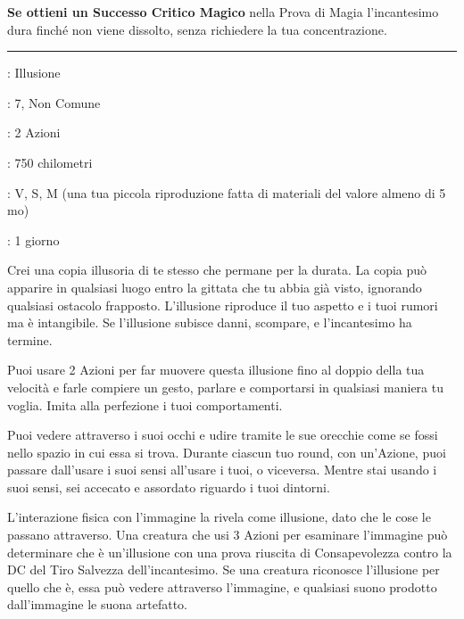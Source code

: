 \begin{multicols}{2}
\textbf{Se ottieni un Successo Critico Magico} nella Prova di Magia l'incantesimo dura finché non viene dissolto, senza richiedere la tua concentrazione.

\smallskip\noindent\rule{\linewidth}{2pt} \hypertarget{Immagine Proiettata}{}\medskip{}
\noindent
\begin{description}[noitemsep, topsep=0pt, parsep=0pt, partopsep=0pt, leftmargin=0cm, labelwidth=2.8cm]
	\item[\textbf{Lista di Magia}]: Illusione
	\item[\textbf{Livello}]: 7, Non Comune
	\item[\textbf{T. di Lancio}]: 2 Azioni
	\item[\textbf{Gittata}]: 750 chilometri
	\item[\textbf{Componenti}]: V, S, M (una tua piccola riproduzione fatta di materiali del valore almeno di 5 mo)
	\item[\textbf{Durata}]: 1 giorno
\end{description}

Crei una copia illusoria di te stesso che permane per la durata. La copia può apparire in qualsiasi luogo entro la gittata che tu abbia già visto, ignorando qualsiasi ostacolo frapposto. L'illusione riproduce il tuo aspetto e i tuoi rumori ma è intangibile. Se l'illusione subisce danni, scompare, e l'incantesimo ha termine.

Puoi usare 2 Azioni per far muovere questa illusione fino al doppio della tua velocità e farle compiere un gesto, parlare e comportarsi in qualsiasi maniera tu voglia. Imita alla perfezione i tuoi comportamenti.

Puoi vedere attraverso i suoi occhi e udire tramite le sue orecchie come se fossi nello spazio in cui essa si trova. Durante ciascun tuo round, con un'Azione, puoi passare dall'usare i suoi sensi all'usare i tuoi, o viceversa. Mentre stai usando i suoi sensi, sei accecato e assordato riguardo i tuoi dintorni.

L'interazione fisica con l'immagine la rivela come illusione, dato che le cose le passano attraverso. Una creatura che usi 3 Azioni per esaminare l'immagine può determinare che è un'illusione con una prova riuscita di Consapevolezza contro la DC del Tiro Salvezza dell'incantesimo. Se una creatura riconosce l'illusione per quello che è, essa può vedere attraverso l'immagine, e qualsiasi suono prodotto dall'immagine le suona artefatto.


\end{multicols}
